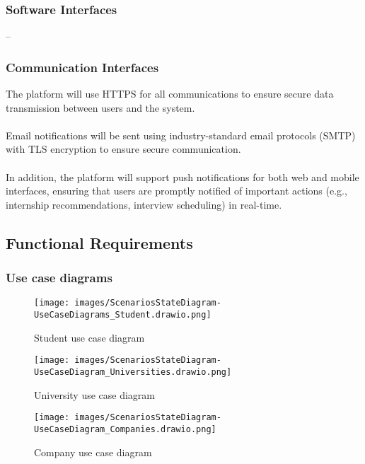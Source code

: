 \subsubsection{Software Interfaces}

--

\subsubsection{Communication Interfaces}

The platform will use HTTPS for all communications to ensure secure data transmission between users and the system.\\ \\
Email notifications will be sent using industry-standard email protocols (SMTP) with TLS encryption to ensure secure communication. \\ \\
In addition, the platform will support push notifications for both web and mobile interfaces, ensuring that users are promptly notified of important actions (e.g., internship recommendations, interview scheduling) in real-time. 

\subsection{Functional Requirements}
\subsubsection{Use case diagrams}
\begin{figure}[ht!]
    \centering
    \texttt{[image: images/ScenariosStateDiagram-UseCaseDiagrams\_Student.drawio.png]}
    \caption{Student use case diagram}
\end{figure}

\begin{figure}[ht!]
    \centering
    \texttt{[image: images/ScenariosStateDiagram-UseCaseDiagram\_Universities.drawio.png]}
    \caption{University use case diagram}

\end{figure}

\begin{figure}[ht!]
    \centering
    \texttt{[image: images/ScenariosStateDiagram-UseCaseDiagram\_Companies.drawio.png]}
    \caption{Company use case diagram}

\end{figure}

